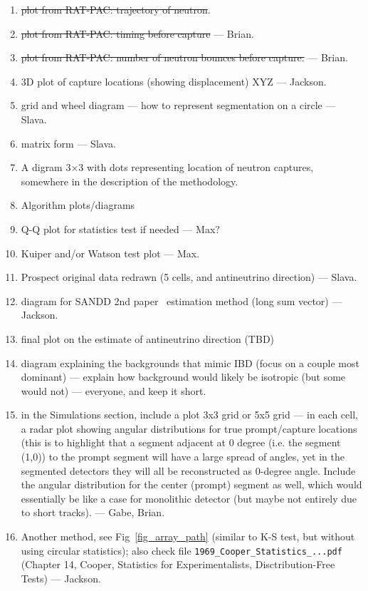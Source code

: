 \begin{enumerate}
    \item \sout{plot from RAT-PAC: trajectory of neutron}.
    \item \sout{plot from RAT-PAC: timing before capture} --- Brian.
    \item \sout{plot from RAT-PAC: number of neutron bounces before capture.} --- Brian.
    \item 3D plot of capture locations (showing displacement) XYZ --- Jackson.
    \item grid and wheel diagram --- how to represent segmentation on a circle --- Slava.
    \item matrix form --- Slava.
    \item A digram 3$\times$3 with dots representing location of neutron captures, somewhere in the description of the methodology.
    \item Algorithm plots/diagrams
    \item Q-Q plot for statistics test if needed --- Max?
\item Kuiper and/or Watson test plot --- Max.
    \item Prospect original data redrawn (5 cells, and antineutrino direction) --- Slava.
    \item diagram for SANDD 2nd paper~\cite{Sutanto:2021xpo} estimation method (long sum vector) --- Jackson.
    \item final plot on the estimate of antineutrino direction (TBD)
    \item diagram explaining the backgrounds that mimic IBD (focus on a couple most dominant) --- explain how background would likely be isotropic (but some would not) --- everyone, and keep it short.
    \item in the Simulations section, include a plot 3x3 grid or 5x5 grid --- in each cell, a radar plot showing angular distributions for true prompt/capture locations (this is to highlight that a segment adjacent at 0 degree (i.e. the segment (1,0)) to the prompt segment will have a large spread of angles, yet in the segmented detectors they will all be reconstructed as 0-degree angle. Include the angular distribution for the center (prompt) segment as well, which would essentially be like a case for monolithic detector (but maybe not entirely due to short tracks). --- Gabe, Brian.
    \item Another method, see Fig~\ref{fig_array_path} (similar to K-S test, but without using circular statistics); also check file \verb|1969_Cooper_Statistics_...pdf| (Chapter 14, Cooper, Statistics for Experimentalists, Disctribution-Free Tests) --- Jackson.

\end{enumerate}
